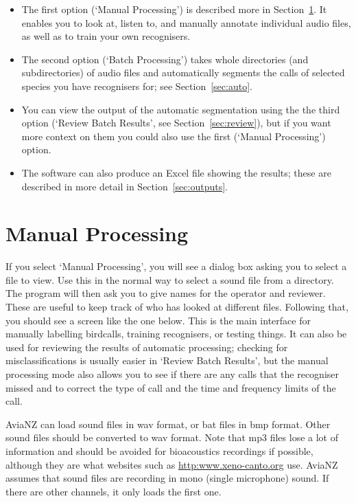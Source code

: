 \documentclass{article}
\begin{document}
\begin{itemize}
\item The first option (`Manual Processing') is described more in Section~\ref{sec:manual}. It enables you to look at, listen to, and manually annotate individual audio files, as well as to train your own recognisers. 
\item The second option (`Batch Processing') takes whole directories (and subdirectories) of audio files and automatically segments the calls of selected species you have recognisers for; see Section~\ref{sec:auto}. 
\item You can view the output of the automatic segmentation using the the third option (`Review Batch Results', see Section~\ref{sec:review}), but if you want more context on them you could also use the first (`Manual Processing') option. 
\item The software can also produce an Excel file showing the results; these are described in more detail in Section~\ref{sec:outputs}. 
\end{itemize}

\newpage
\section{Manual Processing}
\label{sec:manual}

If you select `Manual Processing', you will see a dialog box asking you to select a file to view. Use this in the normal way to select a sound file from a directory. The program will then ask you to give names for the operator and reviewer. These are useful to keep track of who has looked at different files. Following that, you should see a screen like the one below. This is the main interface for manually labelling birdcalls, training recognisers, or testing things. It can also be used for reviewing the results of automatic processing; checking for misclassifications is usually easier in `Review Batch Results', but the manual processing mode also allows you to see if there are any calls that the recogniser missed and to correct the type of call and the time and frequency limits of the call.

AviaNZ can load sound files in wav format, or bat files in bmp format. Other sound files should be converted to wav format. Note that mp3 files lose a lot of information and should be avoided for bioacoustics recordings if possible, although they are what websites such as \url{http:www.xeno-canto.org} use. AviaNZ assumes that sound files are recording in mono (single microphone) sound. If there are other channels, it only loads the first one.
\end{document}
